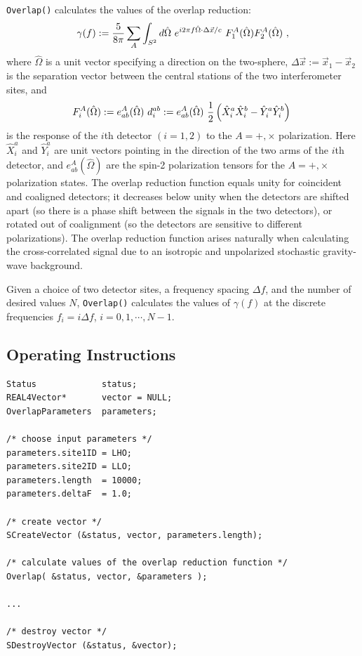 \documentclass{article}
\begin{document}
{\tt Overlap()\/} calculates the values of the overlap reduction:
%
\begin{equation}
\gamma(f):={5\over 8\pi}\sum_A\int_{S^2}d\hat\Omega\
e^{i2\pi f\hat\Omega\cdot\Delta \vec x/c}\ 
F_1^A(\hat\Omega)F_2^A(\hat\Omega)\ ,
\label{e:gamma(f)}
\end{equation}
%
where $\hat \Omega$ is a unit vector specifying a direction on the 
two-sphere, $\Delta\vec x:=\vec x_1-\vec x_2$ is the separation vector 
between the central stations of the two interferometer sites, and 
%
\begin{equation}
F_i^A(\hat\Omega):=e_{ab}^A(\hat\Omega)\ d_i^{ab}:=
e_{ab}^A(\hat\Omega)\ {1\over 2}\left(\hat X_i^a\hat X_i^b-
\hat Y_i^a\hat Y_i^b\right)\ 
\label{e:F_i^A}
\end{equation}
%
is the response of the $i$th detector $(i=1,2)$ to the $A=+,\times$ 
polarization.  
Here $\hat X_i^a$ and $\hat Y_i^a$ are unit vectors pointing in the
direction of the two arms of the $i$th detector, and 
$e_{ab}^A(\hat\Omega)$ are the spin-2 polarization tensors for the
$A=+,\times$ polarization states.
The overlap reduction function equals unity for coincident and coaligned 
detectors; it decreases below unity when the detectors are shifted apart 
(so there is a phase shift between the signals in the 
two detectors), or  rotated out of coalignment (so the detectors are 
sensitive to different polarizations).
The overlap reduction function arises naturally when calculating the 
cross-correlated signal due to an isotropic and unpolarized stochastic 
gravity-wave background.

Given a choice of two detector sites, a frequency spacing $\Delta f$,
and the number of desired values $N$, {\tt Overlap()\/} calculates
the values of $\gamma(f)$ at the discrete frequencies 
$f_i=i\Delta f$, $i=0,1,\cdots, N-1$.

\subsection{Operating Instructions}

\begin{verbatim}
Status             status; 
REAL4Vector*       vector = NULL;
OverlapParameters  parameters;

/* choose input parameters */
parameters.site1ID = LHO;
parameters.site2ID = LLO;
parameters.length  = 10000;
parameters.deltaF  = 1.0;

/* create vector */
SCreateVector (&status, vector, parameters.length);

/* calculate values of the overlap reduction function */
Overlap( &status, vector, &parameters );

... 

/* destroy vector */
SDestroyVector (&status, &vector);
\end{verbatim}
\end{document}
